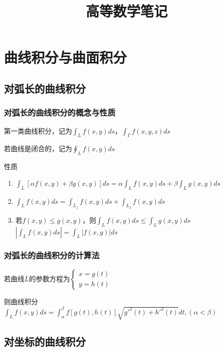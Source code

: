 \documentclass{article} %
\title{高等数学笔记}  %
\author{}   %
\date{}       %
\begin{document}
\maketitle          %

\tableofcontents
\thispagestyle{empty}
\clearpage
\setcounter{page}{1}





\section{曲线积分与曲面积分}
\subsection{对弧长的曲线积分}
\subsubsection{对弧长的曲线积分的概念与性质}
第一类曲线积分，记为$\displaystyle \int_Lf(x,y)ds$，$\displaystyle\int_\Gamma f(x,y,z)ds$\par
若曲线是闭合的，记为$\displaystyle \oint_Lf(x,y)ds$\par
性质
\begin{enumerate}
    \item $\displaystyle \int_L [\alpha f(x,y)+\beta g(x,y)]ds= \alpha\int_L f(x,y)ds+\beta\int_L g(x,y)ds$
    \item $\displaystyle \int_Lf(x,y)ds=\int_{L_1}f(x,y)ds+\int_{L_2}f(x,y)ds$
    \item 若$f(x,y)\leq g(x,y)$，则$\displaystyle\int_L f(x,y)ds\leq\int_Lg(x,y)ds$\\
        $\displaystyle\left|\int_Lf(x,y)ds\right|=\int_L|f(x,y)|ds$
\end{enumerate}

\subsubsection{对弧长的曲线积分的计算法}
若曲线$L$的参数方程为$\left\{\begin{array}{ll}
x=g(t)\\
y=h(t)
\end{array}\right.$\par
则曲线积分$\displaystyle \int_L f(x,y)ds=\int_{\alpha}^{\beta}f[g(t),h(t)]\sqrt{g'^2(t)+h'^2(t)}dt,(\alpha<\beta)$

\subsection{对坐标的曲线积分}
\end{document}
